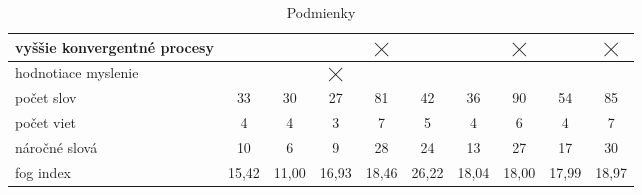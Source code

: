 \begin{table}[ht]
\begin{adjustbox}{width=0.9\textwidth}
\begin{tabular}{|l|c|c|c|c|c|c|c|c|c|}
vyššie konvergentné procesy        &  &  &  & $\bigtimes$  &  &  & $\bigtimes$ & & $\bigtimes$ \\ \hline
hodnotiace myslenie                & &  & $\bigtimes$  &  &   &  &  & & \\ \Xhline{4\arrayrulewidth}
počet slov  & 33 & 30 & 27  & 81  & 42  &  36 & 90 & 54 & 85 \\ \hline
počet viet  & 4 & 4 &  3 &  7 &  5 & 4 & 6 & 4 & 7 \\ \hline
náročné slová & 10 & 6 & 9 & 28  & 24 & 13  & 27 & 17 & 30 \\ \hline
fog index                          & 15,42  & 11,00  & 16,93  &  18,46 & 26,22  & 18,04 &  18,00 & 17,99 & 18,97 \\ \hline
\end{tabular}
\end{adjustbox}
\caption{Podmienky}
\end{table} 

